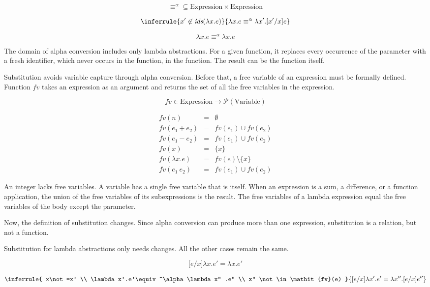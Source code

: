 \[
\equiv^\alpha \subseteq \text{Expression}\times\text{Expression}
\]

\[
\inferrule
{ x'\not\in\textit{ids}(\lambda x.e) }
{ \lambda x.e\equiv^\alpha\lambda x'.\lbrack x'/x\rbrack e }
\]

\[
\lambda x.e\equiv^\alpha\lambda x.e
\]

The domain of alpha conversion includes only lambda abstractions. For a given
function, it replaces every occurrence of the parameter with a fresh identifier,
which never occurs in the function, in the function. The result can be the
function itself.

Substitution avoids variable capture through alpha conversion. Before that, a
free variable of an expression must be formally defined. Function \(\mathit{fv}\)
takes an expression as an argument and returns the set of all the free variables
in the expression.

\[
\mathit{fv}\in \text{Expression}\rightarrow \mathcal{P}(\text{Variable})
\]

\[
\begin{array}{rcl}
\mathit{fv}(n) & = & \emptyset \\
\mathit{fv}(e_1+e_2) & = & \mathit{fv}(e_1)\cup\mathit{fv}(e_2) \\
\mathit{fv}(e_1-e_2) & = & \mathit{fv}(e_1)\cup\mathit{fv}(e_2) \\
\mathit{fv}(x) & = & \{x\} \\
\mathit{fv}(\lambda x.e) & = & \mathit{fv}(e)\setminus\{x\} \\
\mathit{fv}(e_1\ e_2) & = & \mathit{fv}(e_1)\cup\mathit{fv}(e_2)
\end{array}
\]

An integer lacks free variables. A variable has a single free variable that is
itself. When an expression is a sum, a difference, or a function application, the
union of the free variables of its subexpressions is the result. The free
variables of a lambda expression equal the free variables of the body except the
parameter.

Now, the definition of substitution changes. Since alpha conversion can produce
more than one expression, substitution is a relation, but not a function.

Substitution for lambda abstractions only needs changes. All the other cases
remain the same.

\[
\lbrack e/x \rbrack\lambda x.e' = \lambda x.e'
\]

\[
\inferrule
{ x\not=x' \\
  \lambda x'.e'\equiv^\alpha \lambda x'' .e'' \\
  x'' \not\in\mathit{fv}(e) }
{ \lbrack e/x \rbrack\lambda x'.e' =
  \lambda x'' .\lbrack e/x \rbrack e'' }
\]

